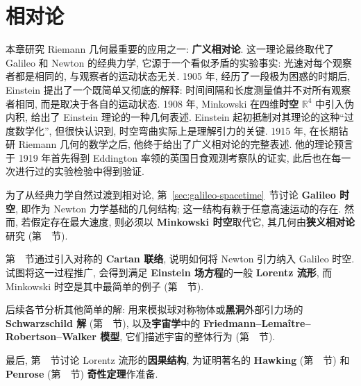 \chapter{相对论}\label{chap:relativity}
\begingroup
\renewcommand{\thefootnote}{}
\endgroup

本章研究 Riemann 几何最重要的应用之一: \textbf{广义相对论}. 这一理论最终取代了 Galileo 和 Newton 的经典力学, 它源于一个看似矛盾的实验事实: 光速对每个观察者都是相同的, 与观察者的运动状态无关. 1905 年, 经历了一段极为困惑的时期后, Einstein 提出了一个既简单又彻底的解释: 时间间隔和长度测量值并不对所有观察者相同, 而是取决于各自的运动状态. 1908 年, Minkowski 在四维\textbf{时空} $\mathbb{R}^4$ 中引入伪内积, 给出了 Einstein 理论的一种几何表述. Einstein 起初抵制对其理论的这种\textquotedblleft 过度数学化\textquotedblright, 但很快认识到, 时空弯曲实际上是理解引力的关键. 1915 年, 在长期钻研 Riemann 几何的数学之后, 他终于给出了广义相对论的完整表述. 他的理论预言于 1919 年首先得到 Eddington 率领的英国日食观测考察队的证实, 此后也在每一次进行过的实验检验中得到验证.

为了从经典力学自然过渡到相对论, 第~\ref{sec:galileo-spacetime}~节讨论 \textbf{Galileo 时空}, 即作为 Newton 力学基础的几何结构; 这一结构有赖于任意高速运动的存在. 然而, 若假定存在最大速度, 则必须以 \textbf{Minkowski 时空}取代它, 其几何由\textbf{狭义相对论}研究 (第~~节).

第~~节通过引入对称的 \textbf{Cartan 联络}, 说明如何将 Newton 引力纳入 Galileo 时空. 试图将这一过程推广, 会得到满足 \textbf{Einstein 场方程}的一般 \textbf{Lorentz 流形}, 而 Minkowski 时空是其中最简单的例子 (第~~节).

后续各节分析其他简单的解: 用来模拟球对称物体或\textbf{黑洞}外部引力场的 \textbf{Schwarzschild 解} (第~~节), 以及\textbf{宇宙学}中的 \textbf{Friedmann–Lemaître–Robertson–Walker 模型}, 它们描述宇宙的整体行为 (第~~节).

最后, 第~~节讨论 Lorentz 流形的\textbf{因果结构}, 为证明著名的 \textbf{Hawking} (第~~节) 和 \textbf{Penrose} (第~~节) \textbf{奇性定理}作准备.
